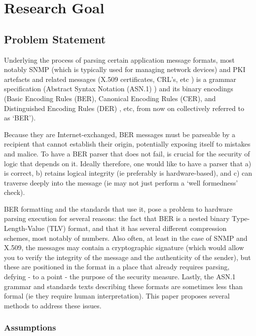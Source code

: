 \section{Research Goal}

\subsection{Problem Statement}

Underlying the process of parsing certain application message formats,
most notably SNMP \cite{bib:snmp}
(which is typically used for managing network devices) and PKI 
artefacts and related messages (X.509 certificates, CRL’s, etc \cite{bib:x509})
is a grammar 
specification (Abstract Syntax Notation (ASN.1) \cite{bib:asn1})
and its binary 
encodings (Basic Encoding Rules (BER), Canonical Encoding Rules (CER), and 
Distinguished Encoding Rules (DER) \cite{bib:ber},
etc, from now on collectively 
referred to as ‘BER’).

Because they are Internet-exchanged, BER messages must 
be parseable by a recipient that cannot establish their origin, 
potentially exposing itself to mistakes and malice. To have a BER parser 
that does not fail, is crucial for the security of logic that depends on 
it. Ideally therefore, one would like to have a parser that a) is correct, 
b) retains logical integrity (ie preferably is hardware-based), and c) can 
traverse deeply into the message (ie may not just perform a ‘well 
formedness’ check).

BER formatting and the standards that use it, pose a problem to hardware 
parsing execution for several reasons: the fact that BER is a nested 
binary Type-Length-Value (TLV) format, and that it has several different 
compression schemes, most notably of numbers. Also often, at least in the 
case of SNMP and X.509, the messages may contain a cryptographic signature 
(which would allow you to verify the integrity of the message and the 
authenticity of the sender), but these are positioned in the format in a 
place that already requires parsing, defying - to a point - the purpose of
the security 
measure. Lastly, the ASN.1 grammar and standards texts describing these 
formats are sometimes less than formal (ie they require human 
interpretation). This paper proposes several methods to address these 
issues.

\subsubsection{Assumptions}

